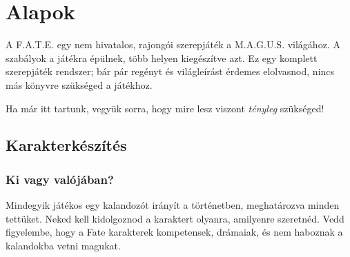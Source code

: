 \chapter{Alapok}

A F.A.T.E. egy nem hivatalos, rajongói szerepjáték a M.A.G.U.S. világához. A szabályok a  játékra épülnek, több helyen kiegészítve azt. Ez egy komplett szerepjáték rendszer; bár pár regényt és világleírást érdemes elolvasnod, nincs más könyvre szükséged a játékhoz.

Ha már itt tartunk, vegyük sorra, hogy mire lesz viszont \emph{tényleg} szükséged!



\section{Karakterkészítés}

\subsection{Ki vagy valójában?}

Mindegyik játékos egy kalandozót irányít a történetben, meghatározva minden tettüket. Neked kell kidolgoznod a karaktert olyanra, amilyenre szeretnéd. Vedd figyelembe, hogy a Fate karakterek kompetensek, drámaiak, és nem haboznak a kalandokba vetni magukat.



